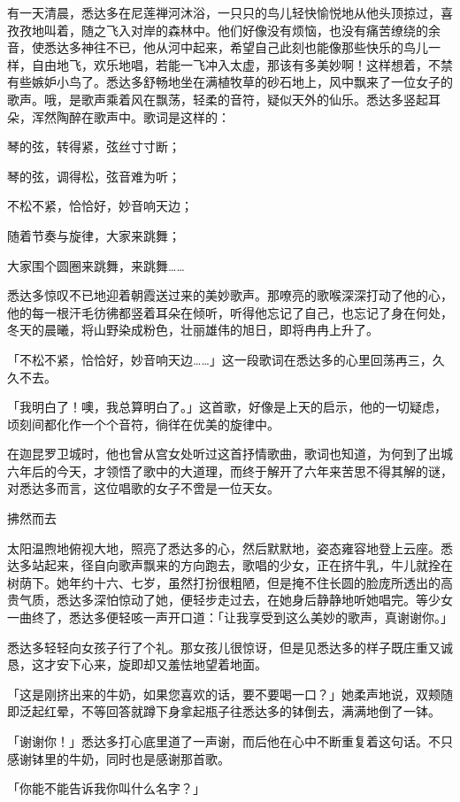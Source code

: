 \documentclass[12pt,twoside,openany]{book}
\begin{document}
有一天清晨，悉达多在尼莲禅河沐浴，一只只的鸟儿轻快愉悦地从他头顶掠过，喜孜孜地叫着，随之飞入对岸的森林中。他们好像没有烦恼，也没有痛苦缭绕的余音，使悉达多神往不已，他从河中起来，希望自己此刻也能像那些快乐的鸟儿一样，自由地飞，欢乐地唱，若能一飞冲入太虚，那该有多美妙啊！这样想着，不禁有些嫉妒小鸟了。悉达多舒畅地坐在满植牧草的砂石地上，风中飘来了一位女子的歌声。哦，是歌声乘着风在飘荡，轻柔的音符，疑似天外的仙乐。悉达多竖起耳朵，浑然陶醉在歌声中。歌词是这样的：

琴的弦，转得紧，弦丝寸寸断；

琴的弦，调得松，弦音难为听；

不松不紧，恰恰好，妙音响天边；

随着节奏与旋律，大家来跳舞；

大家围个圆圈来跳舞，来跳舞……

悉达多惊叹不已地迎着朝霞送过来的美妙歌声。那嘹亮的歌喉深深打动了他的心，他的每一根汗毛彷彿都竖着耳朵在倾听，听得他忘记了自己，也忘记了身在何处，冬天的晨曦，将山野染成粉色，壮丽雄伟的旭日，即将冉冉上升了。

「不松不紧，恰恰好，妙音响天边……」这一段歌词在悉达多的心里回荡再三，久久不去。

「我明白了！噢，我总算明白了。」这首歌，好像是上天的启示，他的一切疑虑，顷刻间都化作一个个音符，徜徉在优美的旋律中。

在迦昆罗卫城时，他也曾从宫女处听过这首抒情歌曲，歌词也知道，为何到了出城六年后的今天，才领悟了歌中的大道理，而终于解开了六年来苦思不得其解的谜，对悉达多而言，这位唱歌的女子不啻是一位天女。

拂然而去

太阳温煦地俯视大地，照亮了悉达多的心，然后默默地，姿态雍容地登上云座。悉达多站起来，径自向歌声飘来的方向跑去，歌唱的少女，正在挤牛乳，牛儿就拴在树荫下。她年约十六、七岁，虽然打扮很粗陋，但是掩不住长圆的脸庞所透出的高贵气质，悉达多深怕惊动了她，便轻步走过去，在她身后静静地听她唱完。等少女一曲终了，悉达多便轻咳一声开口道：「让我享受到这么美妙的歌声，真谢谢你。」

悉达多轻轻向女孩子行了个礼。那女孩儿很惊讶，但是见悉达多的样子既庄重又诚恳，这才安下心来，旋即却又羞怯地望着地面。

「这是刚挤出来的牛奶，如果您喜欢的话，要不要喝一口？」她柔声地说，双颊随即泛起红晕，不等回答就蹲下身拿起瓶子往悉达多的钵倒去，满满地倒了一钵。

「谢谢你！」悉达多打心底里道了一声谢，而后他在心中不断重复着这句话。不只感谢钵里的牛奶，同时也是感谢那首歌。

「你能不能告诉我你叫什么名字？」
\end{document}
